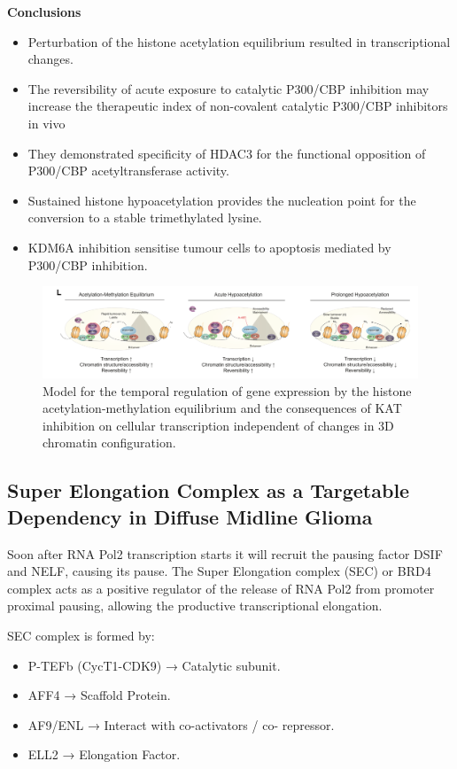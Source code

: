 \textbf{Conclusions}
\begin{itemize}
\tightlist
\item Perturbation of the histone acetylation equilibrium resulted in transcriptional changes.
\item The reversibility of acute exposure to catalytic P300/CBP inhibition may increase the therapeutic index of non-covalent catalytic P300/CBP inhibitors in vivo
\item They demonstrated specificity of HDAC3 for the functional opposition of P300/CBP acetyltransferase activity.
\item Sustained histone hypoacetylation provides the nucleation point for the conversion to a stable trimethylated lysine.
\item KDM6A inhibition sensitise tumour cells to apoptosis mediated by P300/CBP inhibition.
\end{itemize}

\begin{figure}
\centering
\includegraphics[width=\textwidth]{../_resources/Screen_Shot_2022-12-20_at_12-01-08.png}
\caption{Model for the temporal regulation of gene expression by the histone acetylation-methylation equilibrium and the consequences of KAT inhibition on cellular transcription independent of changes in 3D chromatin configuration.}
\end{figure}

\subsection{Super Elongation Complex as a Targetable Dependency in Diffuse Midline Glioma}
Soon after RNA Pol2 transcription starts it will recruit the
pausing factor DSIF and NELF, causing its pause.
The Super Elongation complex (SEC) or BRD4 complex acts as
a positive regulator of the release of RNA Pol2 from
promoter proximal pausing, allowing the productive
transcriptional elongation.

SEC complex is formed by:
\begin{itemize}
\tightlist
\item P-TEFb (CycT1-CDK9) → Catalytic subunit.
\item AFF4 → Scaffold Protein.
\item AF9/ENL → Interact with co-activators / co-
repressor.
\item ELL2 → Elongation Factor.
\end{itemize}

